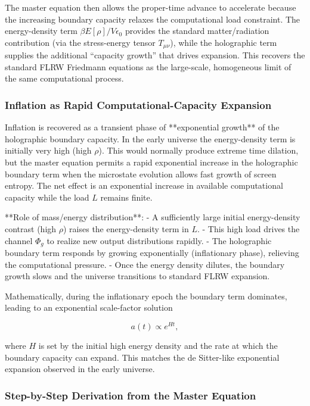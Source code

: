 \documentclass[reprint,amsmath,amssymb,aps,prd,preprintnumbers,superscriptaddress,longbibliography,10pt]{revtex4-2}
\begin{document}
The master equation then allows the proper-time advance to accelerate because the increasing boundary capacity relaxes the computational load constraint. The energy-density term \(\beta E[\rho]/V\epsilon_0\) provides the standard matter/radiation contribution (via the stress-energy tensor \(T_{\mu\nu}\)), while the holographic term supplies the additional “capacity growth” that drives expansion. This recovers the standard FLRW Friedmann equations as the large-scale, homogeneous limit of the same computational process.

\subsubsection{Inflation as Rapid Computational-Capacity Expansion}

Inflation is recovered as a transient phase of **exponential growth** of the holographic boundary capacity. In the early universe the energy-density term is initially very high (high \(\rho\)). This would normally produce extreme time dilation, but the master equation permits a rapid exponential increase in the holographic boundary term when the microstate evolution allows fast growth of screen entropy. The net effect is an exponential increase in available computational capacity while the load \(L\) remains finite.

**Role of mass/energy distribution**:
- A sufficiently large initial energy-density contrast (high \(\rho\)) raises the energy-density term in \(L\).
- This high load drives the channel \(\Phi_g\) to realize new output distributions rapidly.
- The holographic boundary term responds by growing exponentially (inflationary phase), relieving the computational pressure.
- Once the energy density dilutes, the boundary growth slows and the universe transitions to standard FLRW expansion.

Mathematically, during the inflationary epoch the boundary term dominates, leading to an exponential scale-factor solution

\[
a(t) \propto e^{Ht},
\]

where \(H\) is set by the initial high energy density and the rate at which the boundary capacity can expand. This matches the de Sitter-like exponential expansion observed in the early universe.

\subsubsection{Step-by-Step Derivation from the Master Equation}
\end{document}
